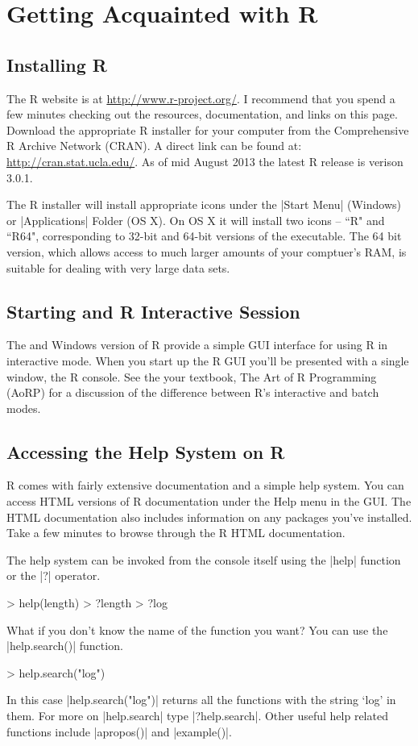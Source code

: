 \section{Getting Acquainted with R}

\subsection{Installing R}


The R website is at \url{http://www.r-project.org/}. I recommend that you spend a few minutes checking out the resources, documentation, and links on this page.   Download the appropriate R installer for your computer from the Comprehensive R Archive Network (CRAN). A direct link can be found at: \url{http://cran.stat.ucla.edu/}. As of mid August 2013 the latest R release is verison 3.0.1.

The R installer will install appropriate icons under the |Start Menu| (Windows) or |Applications| Folder (OS X). On OS X it will install two icons -- ``R" and ``R64", corresponding to 32-bit and 64-bit versions of the executable.  The 64 bit version, which allows access to much larger amounts of your comptuer's RAM, is suitable for dealing with very large data sets. 


\subsection{Starting and R Interactive Session}

 The \OSX and Windows version of R provide a simple GUI
interface for using R in interactive mode. When you start up the R GUI you'll be
presented with a single window, the R console. See the your textbook, The Art of R Programming (AoRP) for a discussion of the difference between R's interactive and batch modes.

\subsection{Accessing the Help System on R}

R comes with fairly extensive documentation and a simple help system. You can
access HTML versions of R documentation under the Help menu in the GUI. The
HTML documentation also includes information on any packages you've installed.
Take a few minutes to browse through the R HTML documentation.

The help system can be invoked from the console itself using the
|help| function or the |?| operator.
%
\begin{R}
> help(length)
> ?length
> ?log
\end{R}
%
What if you don't know the name of the function you want? You can use
the |help.search()| function.
%
\begin{R}
> help.search("log")
\end{R}
%
In this case |help.search("log")| returns all the functions with
the string `log' in them. For more on |help.search| type
|?help.search|. Other useful help related functions include
|apropos()| and |example()|.

